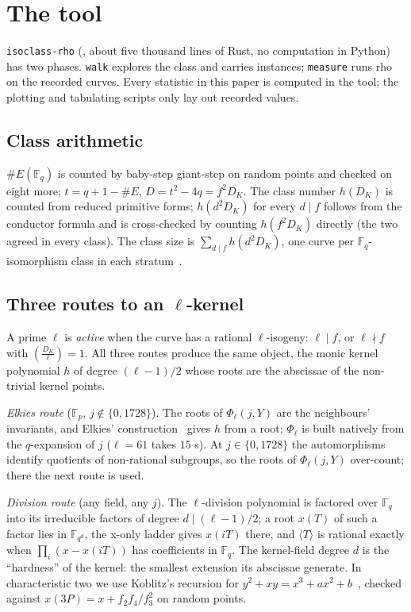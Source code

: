 \documentclass[10pt,a4paper]{article}
\theoremstyle{remark}
\newcommand{\FF}{\mathbb{F}}
\newcommand{\code}[1]{\texttt{#1}}
\DeclareRobustCommand{\art}[1]{\texttt{\detokenize{#1}}}
\begin{document}
\section{The tool}
\label{sec:tool}

\code{isoclass-rho} (\art{crypto:src/bin/isoclass_rho/}, about five thousand
lines of Rust, no computation in Python) has two phases. \code{walk} explores
the class and carries instances; \code{measure} runs rho on the recorded
curves. Every statistic in this paper is computed in the tool; the plotting
and tabulating scripts only lay out recorded values.

\subsection{Class arithmetic}
$\#E(\FF_q)$ is counted by baby-step giant-step on random points and checked
on eight more; $t = q + 1 - \#E$, $D = t^2 - 4q = f^2 D_K$. The class number
$h(D_K)$ is counted from reduced primitive forms; $h(d^2 D_K)$ for every
$d \mid f$ follows from the conductor formula and is cross-checked by counting
$h(f^2 D_K)$ directly (the two agreed in every class). The class size is
$\sum_{d \mid f} h(d^2 D_K)$, one curve per $\FF_q$-isomorphism class in each
stratum~\cite{Kohel1996,Sutherland2013}.

\subsection{Three routes to an $\ell$-kernel}
\label{sec:routes}
A prime $\ell$ is \emph{active} when the curve has a rational $\ell$-isogeny:
$\ell \mid f$, or $\ell \nmid f$ with $\left(\frac{D_K}{\ell}\right) = 1$.
All three routes produce the same object, the monic kernel polynomial $h$
of degree $(\ell - 1)/2$ whose roots are the abscissae of the non-trivial
kernel points.

\emph{Elkies route} ($\FF_p$, $j \notin \{0, 1728\}$). The roots of
$\Phi_\ell(j, Y)$ are the neighbours' invariants, and Elkies'
construction~\cite{Elkies1998,Schoof1995} gives $h$ from a root; $\Phi_\ell$ is
built natively from the $q$-expansion of $j$ ($\ell = 61$ takes $15$ s). At
$j \in \{0, 1728\}$ the automorphisms identify quotients of non-rational
subgroups, so the roots of $\Phi_\ell(j, Y)$ over-count; there the next route
is used.

\emph{Division route} (any field, any $j$). The $\ell$-division polynomial is
factored over $\FF_q$ into its irreducible factors of degree $d \mid
(\ell-1)/2$; a root $x(T)$ of such a factor lies in $\FF_{q^d}$, the x-only
ladder gives $x(iT)$ there, and $\langle T\rangle$ is rational exactly when
$\prod_i (x - x(iT))$ has coefficients in $\FF_q$. The kernel-field degree
$d$ is the ``hardness'' of the kernel: the smallest extension its abscissae
generate. In characteristic two we use Koblitz's recursion for
$y^2 + xy = x^3 + ax^2 + b$~\cite{Koblitz1991}, checked against
$x(3P) = x + f_2 f_4 / f_3^2$ on random points.
\end{document}
